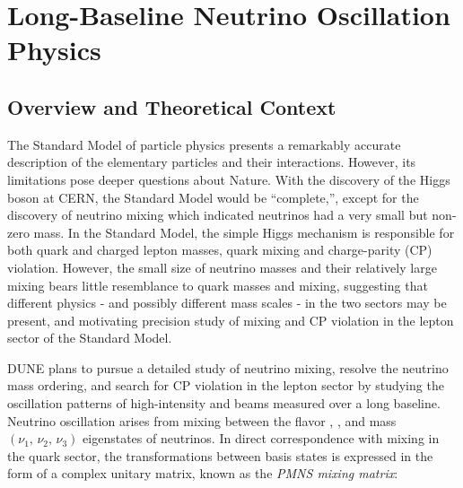 \chapter{Long-Baseline Neutrino Oscillation Physics}
\label{ch:physics-lbnosc}

\section{Overview and Theoretical Context} %
\label{sec:physics-lbnosc-context}

The Standard Model of particle physics presents a remarkably accurate
description of the elementary particles and their
interactions. However, its limitations pose deeper questions about
Nature. With the discovery of the Higgs boson at CERN, the Standard
Model would be ``complete,'', except for the discovery of neutrino
mixing which indicated neutrinos had a very small but non-zero
mass. In the Standard Model, the simple Higgs mechanism is responsible
for both quark and charged lepton masses, quark mixing and
charge-parity (CP) violation. However, the small size of neutrino
masses and their relatively large mixing bears little resemblance to
quark masses and mixing, suggesting that different physics - and
possibly different mass scales - in the two sectors may be present,
and motivating precision study of mixing and CP violation in the
lepton sector of the Standard Model.


DUNE plans to pursue a detailed study of neutrino mixing, resolve the
neutrino mass ordering, and search for CP violation in the lepton
sector by studying the oscillation patterns of
high-intensity \numu and \anumu %
beams measured over a long baseline.  Neutrino oscillation arises from
mixing between the flavor %
\nue, \numu, \nutau and mass $(\nu_1,\, \nu_2,\, \nu_3)$ eigenstates
of neutrinos.
In direct correspondence with mixing in the quark sector, the transformations
between basis states is expressed in the form of a complex unitary
matrix, known as the \textit{PMNS mixing matrix}: 

